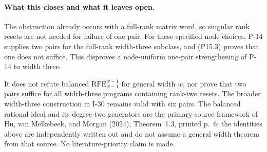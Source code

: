 \paragraph{What this closes and what it leaves open.}
The obstruction already occurs with a full-rank matrix word,
so singular rank resets are not needed for failure of one pair.
For these specified node choices, P-14 supplies two pairs for
the full-rank width-three subclass, and (P15.3) proves that one
does not suffice. This disproves a node-uniform one-pair
strengthening of P-14 to width three.

It does not refute balanced $\mathrm{RFE}_{w-1}^{w-1}$ for
general width $w$, nor prove that two pairs suffice for all
width-three programs containing rank-two resets. The broader
width-three construction in I-30 remains valid with six pairs.
The balanced rational ideal and its degree-two generators are
the primary-source framework of Hu, van Melkebeek, and Morgan
(2024), Theorem~1.3, printed p.~6; the identities above are
independently written out and do not assume a general width
theorem from that source. No literature-priority claim is made.

